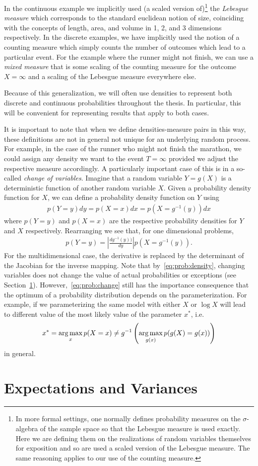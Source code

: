 In the continuous example
we implicitly used (a scaled version of)\footnote{In more formal settings, one normally defines
	 probability measures on the $\sigma$-algebra of the sample space so that the 
	 Lebesgue measure is used exactly.  Here we are defining them on the 
	 realizations of random variables themselves for exposition and so are used a scaled version
	 of the Lebesgue measure.  The same reasoning applies to our use of the counting measure.}
the \emph{Lebesgue measure} which corresponds to
the standard euclidean notion of size, coinciding with the concepts of length, area, and
volume in 1, 2, and 3 dimensions respectively.  In the discrete examples, we have implicitly
used the notion of a counting measure which simply counts the number of outcomes which
lead to a particular event.   For the example where the runner might not finish, we can
use a \emph{mixed measure} that is some scaling of the counting measure for the outcome
$X=\infty$ and a scaling of the Lebesgue measure everywhere else.  

Because of this generalization, we will often use densities to represent both discrete
and continuous probabilities throughout the thesis.  In particular, this will be convenient
for representing results that apply to both cases.

It is important to note that when we define densities-measure pairs in this way, these 
definitions are not in general not unique for an underlying random process.  For example, 
in the case of the runner who might not finish the marathon, we could assign any density 
we want to the event $T=\infty$ provided we adjust the respective measure accordingly.
A particularly important case of this is in a so-called \emph{change of variables}.  Imagine
that a random variable $Y=g(X)$ is a deterministic function of another random variable $X$.
Given a probability density function for $X$, we can define a probability density function
on $Y$ using
\begin{align}
\label{eq:prob:change}
p(Y=y)dy = p(X=x)dx = p(X=g^{-1}(y))dx
\end{align} 
where $p(Y=y)$ and $p(X=x)$ are the respective probability densities for $Y$ and $X$
respectively.  Rearranging we see that, for one dimensional problems, 
\begin{align}
\label{eq:prob:change2}
p(Y=y) = \left|\frac{dg^{-1}(y))}{dy}\right|p(X=g^{-1}(y)).
\end{align}
For the multidimensional case, the derivative is replaced by the determinant of the
Jacobian for the inverse mapping.  Note that by~\eqref{eq:prob:density}, changing
variables does not change the value of actual probabilities or exceptions (see
 Section~\ref{sec:prob:expt}).  However,~\eqref{eq:prob:change}
still has the importance consequence that the optimum of a probability distribution
depends on the parameterization.  For example, if we parameterizing the same model with
either $X$ or $\log X$ will lead to different value of the most likely value of the parameter
$x^*$, i.e.
\begin{align}
x^* = \operatorname*{arg\,max}_{x} p(X=x) \neq g^{-1} \left(\operatorname*{arg\,max}_{g(x)} p(g(X)=g(x))\right)
\end{align}
in general.

\section{Expectations and Variances}
\label{sec:prob:expt}
